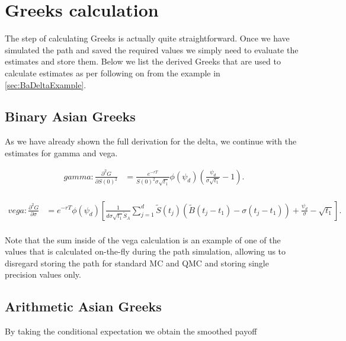 \section{Greeks calculation} \label{sec:GreeksCalculation}
The step of calculating Greeks is actually quite straightforward. Once we have simulated the path and saved the required values we simply need to evaluate the estimates and store them. Below we list the derived Greeks that are used to calculate estimates as per \cite{ZhangConditionalQuasiMonteCarloMethod} following on from the example in \ref{sec:BaDeltaExample}.

\subsection{Binary Asian Greeks}
As we have already shown the full derivation for the delta, we continue with the estimates for gamma and vega.

\begin{equation*}
\begin{aligned}
    gamma: \frac{{\partial}^2 G}{\partial {S(0)}^2} &= \frac{e^{-rT}}{{S(0)}^2\sigma \sqrt{t_1}}\phi(\psi_d)\left(\frac{\psi_d}{\sigma \sqrt{t_1}} - 1\right). \\[10pt]
\end{aligned}
\end{equation*}

\begin{equation*}
\begin{aligned}
    vega: \frac{{\partial}^2 G}{\partial \sigma} &= e^{-rT}\phi(\psi_d) \left[ \frac{1}{d\sigma \sqrt{t_1}\widetilde{S}_A} \sum_{j=1}^d{\widetilde{S}(t_j) (\widetilde{B}(t_j - t_1) - \sigma(t_j - t_1))} + \frac{\psi_d}{\sigma} - \sqrt{t_1} \right]. \\[10pt]
\end{aligned}
\end{equation*}

Note that the sum inside of the vega calculation is an example of one of the values that is calculated on-the-fly during the path simulation, allowing us to disregard storing the path for standard MC and QMC and storing single precision values only.

\subsection{Arithmetic Asian Greeks}
By taking the conditional expectation we obtain the smoothed payoff

